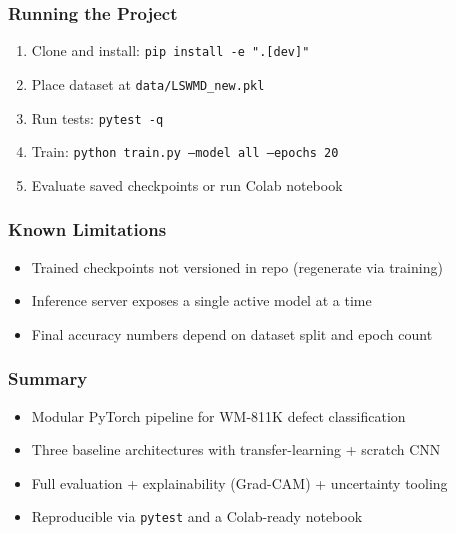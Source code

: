 \documentclass{beamer}
\begin{document}
\begin{frame}
  \frametitle{Running the Project}
  \small
  \begin{enumerate}
    \item Clone and install: \texttt{pip install -e ".[dev]"}
    \item Place dataset at \texttt{data/LSWMD\_new.pkl}
    \item Run tests: \texttt{pytest -q}
    \item Train: \texttt{python train.py --model all --epochs 20}
    \item Evaluate saved checkpoints or run Colab notebook
  \end{enumerate}
\end{frame}

\begin{frame}
  \frametitle{Known Limitations}
  \begin{itemize}
    \item Trained checkpoints not versioned in repo (regenerate via training)
    \item Inference server exposes a single active model at a time
    \item Final accuracy numbers depend on dataset split and epoch count
  \end{itemize}
\end{frame}

\begin{frame}
  \frametitle{Summary}
  \begin{itemize}
    \item Modular PyTorch pipeline for WM-811K defect classification
    \item Three baseline architectures with transfer-learning + scratch CNN
    \item Full evaluation + explainability (Grad-CAM) + uncertainty tooling
    \item Reproducible via \texttt{pytest} and a Colab-ready notebook
  \end{itemize}
\end{frame}
\end{document}
